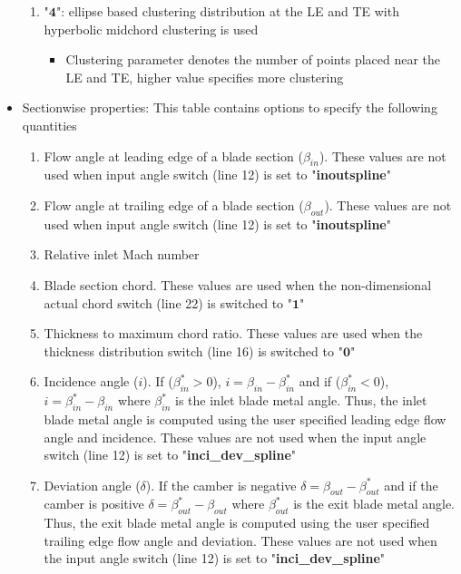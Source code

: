 \documentclass[8pt]{article}
\begin{document}
\begin{itemize}[leftmargin=*]
\begin{enumerate}[label=\alph*]
        \item "$\mathbf{4}$": ellipse based clustering distribution at the LE and TE with hyperbolic midchord clustering is used
        \begin{itemize}[label=\FilledSmallSquare]
            \item Clustering parameter denotes the number of points placed near the LE and TE, higher value specifies more clustering
        \end{itemize}
    \end{enumerate} 
    \item Sectionwise properties: This table contains options to specify the following quantities
    \begin{enumerate}[label=\alph*]
        \item Flow angle at leading edge of a blade section ($\beta_{in}$). These values are not used when input angle switch (line 12) is set to "\textbf{inoutspline}"
        \item Flow angle at trailing edge of a blade section ($\beta_{out}$). These values are not used when input angle switch (line 12) is set to "\textbf{inoutspline}"
        \item Relative inlet Mach number 
        \item Blade section chord. These values are used when the non-dimensional actual chord switch (line 22) is switched to "$\mathbf{1}$"
        \item Thickness to maximum chord ratio. These values are used when the thickness distribution switch (line 16) is switched to "$\mathbf{0}$"
        \item Incidence angle ($i$). If ($\beta_{in}^{*} > 0$), $i = \beta_{in} - \beta_{in}^{*}$ and if ($\beta_{in}^{*} < 0$), $i = \beta_{in}^{*} - \beta_{in}$ where $\beta_{in}^{*}$ is the inlet blade metal angle. Thus, the inlet blade metal angle is computed using the user specified leading edge flow angle and incidence. These values are not used when the input angle switch (line 12) is set to "\textbf{inci\_dev\_spline}"
        \item Deviation angle ($\delta$). If the camber is negative $\delta = \beta_{out} - \beta_{out}^{*}$ and if the camber is positive $\delta = \beta_{out}^{*} - \beta_{out}$ where $\beta_{out}^{*}$ is the exit blade metal angle. Thus, the exit blade metal angle is computed using the user specified trailing edge flow angle and deviation. These values are not used when the input angle switch (line 12) is set to "\textbf{inci\_dev\_spline}"

\end{enumerate}
\end{itemize}
\end{document}
